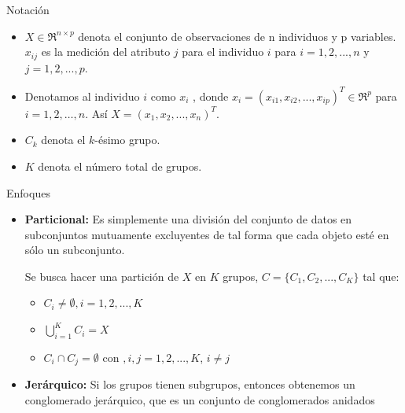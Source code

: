 \documentclass{beamer}
\begin{document}

\begin{frame}{Notación}
  \begin{itemize}
    \item $X \in \Re^{n \times p}$ denota el conjunto de observaciones de n individuos y p variables. $x_{ij}$ es la medición del atributo $j$ para el individuo $i$ para $i=1,2,...,n$ y $j=1,2,...,p$.
    \item Denotamos al individuo $i$ como $x_{i}$ , donde $x_{i} = (x_{i1},x_{i2},...,x_{ip})^T \in \Re^p$ para $i=1,2,\dots,n$. Así $X=(x_{1},x_{2},...,x_{n})^T$.
    \item $C_{k}$ denota el $k$-ésimo grupo.
    \item $K$ denota el número total de grupos.
  \end{itemize}
\end{frame}

\begin{frame}{Enfoques}
  \begin{itemize}
    \item \textbf{Particional:} Es simplemente una división del conjunto de datos en subconjuntos mutuamente excluyentes de tal forma que cada objeto esté en sólo un subconjunto.

    Se busca hacer una partición de $X$ en $K$ grupos, $C = \{C_{1},C_{2},...,C_{K}\}$ tal que:
    \begin{itemize}
      \item $C_{i} \neq \emptyset,i=1,2,...,K $
      \item $\displaystyle \bigcup_{i=1}^{K} C_{i} = X $
      \item $C_{i} \cap C_{j} = \emptyset $ con $, i,j=1,2,...,K $, $i \neq j$ 
    \end{itemize}

    \item \textbf{Jerárquico:} Si los grupos tienen subgrupos, entonces obtenemos un conglomerado jerárquico, que es un conjunto de conglomerados anidados
  \end{itemize}
\end{frame}
\end{document}
